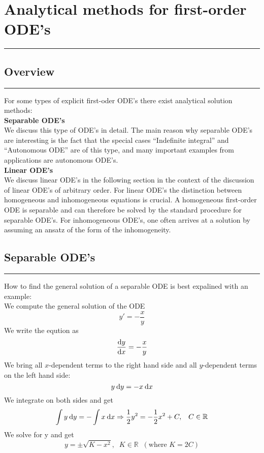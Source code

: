 \section{Analytical methods for first-order ODE’s}
\noindent\rule[\linienAbstand]{\linewidth}{\linienDickeDick}

\subsection{Overview}
\noindent\rule[\linienAbstand]{\linewidth}{\linienDicke}
For some types of explicit first-oder ODE’s there exist analytical solution methods:\\

\textbf{Separable ODE's}\\
We discuss this type of ODE’s in detail. The main reason why separable ODE’s are interesting is the fact that the special cases “Indefinite integral” and “Autonomous ODE” are of this type, and many important examples from applications are autonomous ODE’s.\\

\textbf{Linear ODE's}\\
We discuss linear ODE’s in the following section in the context of the discussion of linear ODE’s of arbitrary order. For linear ODE’s the distinction between homogeneous and inhomogeneous equations is crucial. A homogeneous first-order ODE is separable and can therefore be solved by the standard procedure for separable ODE’s. For inhomogeneous ODE’s, one often arrives at a solution by assuming an ansatz of the form of the inhomogeneity.\\


\subsection{Separable ODE’s}
\noindent\rule[\linienAbstand]{\linewidth}{\linienDicke}
How to find the general solution of a separable ODE is best expalined with an example:\\
We compute the general solution of the ODE
\begin{equation}
  y' = -\frac{x}{y}
\end{equation}
We write the eqution as
\begin{equation}
  \frac{\textup{d}y}{\textup{d}x} = -\frac{x}{y}
\end{equation}
We bring all $x$-dependent terms to the right hand side and all $y$-dependent terms on
the left hand side:
\begin{equation}
  y\:\textup{d}y = -x \:\textup{d}x
\end{equation}
We integrate on both sides and get
\begin{equation}
  \int y\:\textup{d}y = - \int x\:\textup{d}x \Rightarrow \frac{1}{2}y^2 = - \frac{1}{2} x^2 + C, \;\;\; C \in \mathbb{R}
\end{equation}
We solve for y and get
\begin{equation}
  y = \pm \sqrt{K - x^2}, \;\; K \in \mathbb{R}\;\; (\text{where } K = 2C)
\end{equation}

